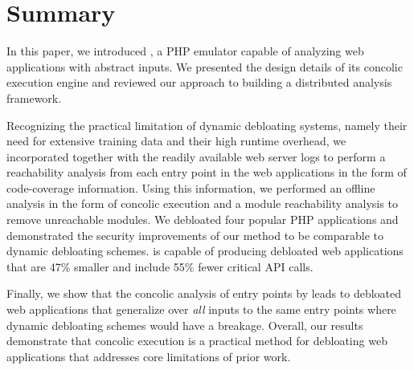 \section{Summary}
In this paper, we introduced \animatedead{}, a PHP emulator capable of analyzing web applications with abstract inputs. 
We presented the design details of its concolic execution engine and reviewed our approach to building a distributed analysis framework. 

Recognizing the practical limitation of dynamic debloating systems, namely their need for extensive training data and their high runtime overhead, 
we incorporated \animatedead{} together with the readily available web server logs to perform a reachability analysis from each entry point in the web applications in the form of code-coverage information. 
Using this information, we performed an offline analysis in the form of concolic execution and a module reachability analysis to remove unreachable modules. 
We debloated four popular PHP applications and demonstrated the security improvements of our method to be comparable to dynamic debloating schemes. 
\animatedead{} is capable of producing debloated web applications that are 47\% smaller and include 55\% fewer critical API calls. 

Finally, we show that the concolic analysis of entry points by \animatedead{} leads to debloated web applications that generalize over \emph{all} inputs to the same entry points where dynamic debloating schemes would have a breakage.  
Overall, our results demonstrate that concolic execution is a practical method for debloating web applications that addresses core limitations of prior work.
